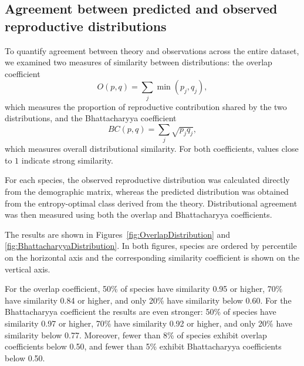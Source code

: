 \documentclass[10pt,a4paper]{amsart}
\theoremstyle{definition}
\theoremstyle{remark}
\numberwithin{equation}{section}
\begin{document}



\subsection{Agreement between predicted and observed reproductive distributions}

To quantify agreement between theory and observations across the entire dataset, we examined two measures of similarity between distributions: the overlap coefficient \cite{Inman1989}
\begin{equation}
	\label{eq_overlap}
	O(p,q)
	=
	\sum_j \min(p_j,q_j),
\end{equation}
which measures the proportion of reproductive contribution shared
by the two distributions, and the Bhattacharyya coefficient
\cite{Pastore2019}
\begin{equation}
	\label{eq_Bhattacharyya}
	BC(p,q)
	=
	\sum_j \sqrt{p_j q_j},
\end{equation}
which measures overall distributional similarity. For both
coefficients, values close to $1$ indicate strong similarity.

For each species, the observed reproductive distribution was
calculated directly from the demographic matrix, whereas the predicted
distribution was obtained from the entropy-optimal class derived from
the theory. Distributional agreement was then measured using both the
overlap and Bhattacharyya coefficients.

The results are shown in
Figures~\ref{fig:OverlapDistribution} and
\ref{fig:BhattacharyyaDistribution}. In both figures, species are
ordered by percentile on the horizontal axis and the corresponding
similarity coefficient is shown on the vertical axis.

For the overlap coefficient, 50\% of species have similarity
0.95 or higher, 70\% have similarity 0.84 or higher, and only 20\%
have similarity below 0.60. For the Bhattacharyya coefficient the
results are even stronger: 50\% of species have similarity 0.97 or
higher, 70\% have similarity 0.92 or higher, and only 20\% have
similarity below 0.77. Moreover, fewer than 8\% of species exhibit
overlap coefficients below 0.50, and fewer than 5\% exhibit
Bhattacharyya coefficients below 0.50.
\end{document}
